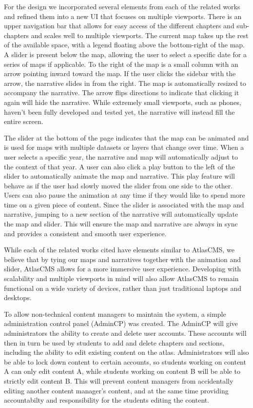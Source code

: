 \documentclass[11pt, final, conference, twocolumn]{IEEEtran}
\begin{document}
For the design we incorporated several elements from each of the related works and refined them into a new UI that focuses on multiple viewports. There is an upper navigation bar that allows for easy access of the different chapters and sub-chapters and scales well to multiple viewports. The current map takes up the rest of the available space, with a legend floating above the bottom-right of the map.  A slider is present below the map, allowing the user to select a specific date for a series of maps if applicable. To the right of the map is a small column with an arrow pointing inward toward the map. If the user clicks the sidebar with the arrow, the narrative slides in from the right. The map is automatically resized to accompany the narrative. The arrow flips directions to indicate that clicking it again will hide the narrative. While extremely small viewports, such as phones, haven't been fully developed and tested yet, the narrative will instead fill the entire screen.

The slider at the bottom of the page indicates that the map can be animated and is used for maps with multiple datasets or layers that change over time. When a user selects a specific year, the narrative and map will automatically adjust to the context of that year. A user can also click a play button to the left of the slider to automatically animate the map and narrative.  This play feature will behave as if the user had slowly moved the slider from one side to the other. Users can also pause the animation at any time if they would like to spend more time on a given piece of content. Since the slider is associated with the map and narrative, jumping to a new section of the narrative will automatically update the map and slider.  This will ensure the map and narrative are always in sync and provides a consistent and smooth user experience.

While each of the related works cited have elements similar to AtlasCMS, we believe that by tying our maps and narratives together with the animation and slider, AtlasCMS allows for a more immersive user experience. Developing with scalability and multiple viewports in mind will also allow AtlasCMS to remain functional on a wide variety of devices, rather than just traditional laptops and desktops.

To allow non-technical content managers to maintain the system, a simple administration control panel (AdminCP) was created.  The AdminCP will give administrators the ability to create and delete user accounts.  These accounts will then in turn be used by students to add and delete chapters and sections, including the ability to edit existing content on the atlas.  Administrators will also be able to lock down content to certain accounts, so students working on content A can only edit content A, while students working on content B will be able to strictly edit content B.  This will prevent content managers from accidentally editing another content manager's content, and at the same time providing accountabilty and responsibility for the students editing the content.
\end{document}

